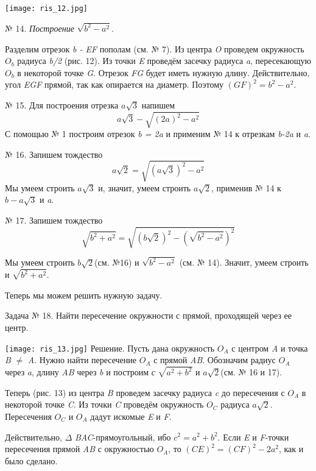 \newpage
\setcounter{page}{9}
\setlength{\columnsep}{50pt}
\begin{multicols}{2}
\texttt{[image: ris\_12.jpg]}\par
№ 14. \textit{Построение} $\sqrt{b^2-a^2}$.\par
Разделим отрезок \textit{b - EF} пополам (см. № 7). Из центра \textit{O} проведем окружность $O_b$ радиуса \textit{b/2} (рис. 12). Из точки \textit{E} проведём засечку радиуса \textit{a}, пересекающую $O_b$ в некоторой точке \textit{G}. Отрезок \textit{FG} будет иметь нужную длину. Действительно, угол \textit{EGF} прямой, так как опирается на диаметр. Поэтому $(GF)^2=b^2-a^2$.\par
№ 15. Для построения отрезка $a\sqrt{3}$ напишем
  $$a\sqrt{3}-\sqrt{(2a)^2-a^2}$$
С помощью № 1 построим отрезок \textit{b = 2a} и применим № 14 к отрезкам \textit{b-2a} и \textit{a}.\par
№ 16. Запишем тождество
   $$a\sqrt{2}=\sqrt{(a\sqrt{3})^2-a^2}$$
Мы умеем строить $a\sqrt{3}$ и, значит, умеем строить $a\sqrt{2}$, применив № 14 к $b-a\sqrt{3}$ и \textit{a}.\par
№ 17. Запишем тождество
$$\sqrt{b^2+a^2}=\sqrt{(b\sqrt{2})^2-(\sqrt{b^2-a^2})^2}$$\par
Мы умеем строить $b\sqrt{2}$(см. №16) и $\sqrt{b^2-a^2}$ (см. № 14). Значит, умеем строить и $\sqrt{b^2+a^2}$.\par
Теперь мы можем решить нужную задачу.\par
Задача № 18. Найти пересечение окружности с прямой, проходящей через ее центр.\par
\texttt{[image: ris\_13.jpg]}\newline
Решение. Пусть дана окружность $O_A$ с центром \textit{A} и точка \textit{B} $\neq$ \textit{A}. Нужно найти пересечение $O_A$ с прямой \textit{AB}. Обозначим радиус $O_A$ через \textit{a}, длину \textit{AB} через \textit{b} и построим \textit{с} $\sqrt{a^2+b^2}$ и $a\sqrt{2}$(см. № 16 и 17).\par
Теперь (рис. 13) из центра \textit{B} проведем засечку радиуса \textit{c} до пересечения с $O_A$ в некоторой точке \textit{C}. Из точки \textit{C} проведём окружность $O_C$ радиуса $a\sqrt{2}$. Пересечения $O_C$ и $O_A$ дадут искомые \textit{E} и \textit{F}.\par
Действительно, $\Delta$ \textit{BAC}-прямоугольный, ибо $c^2=a^2+b^2$. Если \textit{E} и \textit{F}-точки пересечения прямой \textit{AB} с окружностью $O_A$, то $(CE)^2=(CF)^2-2a^2$, как и было сделано.\par

\end{multicols}
